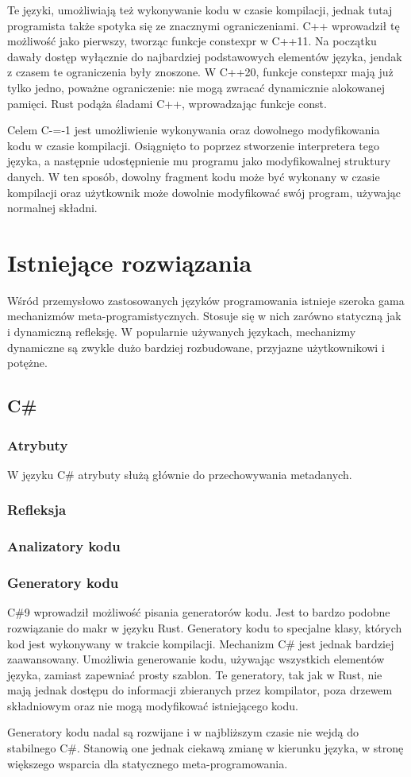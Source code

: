 \documentclass[conference]{IEEEtran}
\begin{document}
Te języki, umożliwiają też wykonywanie kodu w czasie kompilacji, jednak tutaj programista także spotyka się ze znacznymi ograniczeniami.
C++ wprowadził tę możliwość jako pierwszy, tworząc funkcje constexpr w C++11.
Na początku dawały dostęp wyłącznie do najbardziej podstawowych elementów języka, jendak z czasem te ograniczenia były znoszone.
W C++20, funkcje constepxr mają już tylko jedno, poważne ograniczenie: nie mogą zwracać dynamicznie alokowanej pamięci.
Rust podąża śladami C++, wprowadzając funkcje const.

Celem C-=-1 jest umożliwienie wykonywania oraz dowolnego modyfikowania kodu w czasie kompilacji.
Osiągnięto to poprzez stworzenie interpretera tego języka, a następnie udostępnienie mu programu jako modyfikowalnej struktury danych.
W ten sposób, dowolny fragment kodu może być wykonany w czasie kompilacji oraz użytkownik może dowolnie modyfikować swój program, używając normalnej składni.

\section{Istniejące rozwiązania}
Wśród przemysłowo zastosowanych języków programowania istnieje szeroka gama mechanizmów meta-programistycznych. Stosuje się w nich zarówno statyczną jak i dynamiczną refleksję. W popularnie używanych językach, mechanizmy dynamiczne są zwykle dużo bardziej rozbudowane, przyjazne użytkownikowi i potężne.
\subsection{C\#}
\subsubsection{Atrybuty}
W języku C\# atrybuty służą głównie do przechowywania metadanych.
\subsubsection{Refleksja}
\subsubsection{Analizatory kodu}
\subsubsection{Generatory kodu}
C\#9 wprowadził możliwość pisania generatorów kodu. Jest to bardzo podobne rozwiązanie do makr w języku Rust. Generatory kodu to specjalne klasy, których kod jest wykonywany w trakcie kompilacji. 
Mechanizm C\# jest jednak bardziej zaawansowany. Umożliwia generowanie kodu, używając wszystkich elementów języka, zamiast zapewniać prosty szablon. Te generatory, tak jak w Rust, nie mają jednak dostępu do informacji zbieranych przez kompilator, poza drzewem składniowym oraz nie mogą modyfikować istniejącego kodu.\par
Generatory kodu nadal są rozwijane i w najbliższym czasie nie wejdą do stabilnego C\#. Stanowią one jednak ciekawą zmianę w kierunku języka, w stronę większego wsparcia dla statycznego meta-programowania.
\end{document}
